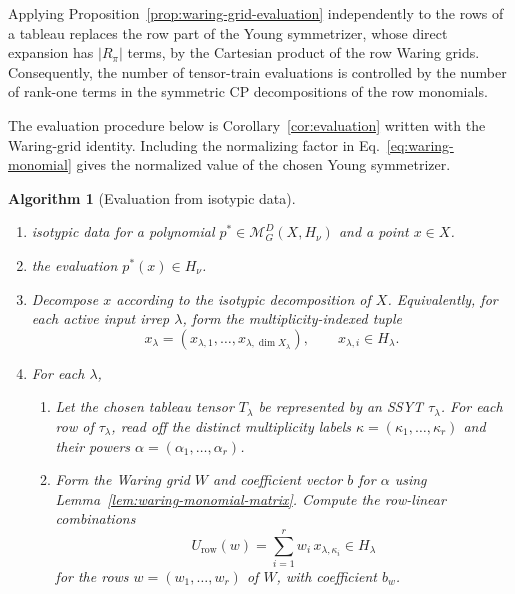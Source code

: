 \documentclass[11pt]{article}
\newcommand{\scM}{\mathcal{M}}
\newtheorem{algorithm}[theorem]{Algorithm}
\theoremstyle{definition}
\begin{document}
Applying Proposition~\ref{prop:waring-grid-evaluation} independently to the rows of a tableau replaces the row part of the Young symmetrizer, whose direct expansion has $|R_\pi|$ terms, by the Cartesian product of the row Waring grids.
Consequently, the number of tensor-train evaluations is controlled by the number of rank-one terms in the symmetric CP decompositions of the row monomials.

The evaluation procedure below is Corollary~\ref{cor:evaluation} written with the Waring-grid identity.
Including the normalizing factor in Eq.~\eqref{eq:waring-monomial} gives the normalized value of the chosen Young symmetrizer.

\begin{algorithm}[Evaluation from isotypic data]\label{alg:evaluate-basis}

  \phantom{}

  \begin{enumerate}[label=\textbf{Step \arabic*.},leftmargin=2.8cm]

    \item[\textbf{Input:}] isotypic data for a polynomial $p^* \in \scM_G^D(X,H_\nu)$ and a point $x \in X$.

    \item[\textbf{Output:}] the evaluation $p^*(x) \in H_\nu$.

    \item Decompose $x$ according to the isotypic decomposition of $X$.
    Equivalently, for each active input irrep $\lambda$, form the multiplicity-indexed tuple
    \[
      x_\lambda=(x_{\lambda,1},\dots,x_{\lambda,\dim X_\lambda}),
      \qquad
      x_{\lambda,i}\in H_\lambda.
    \]

    \item For each $\lambda$,
    \begin{enumerate}[label=\textup{(\alph*)},leftmargin=2.2em]
      \item Let the chosen tableau tensor $T_\lambda$ be represented by an SSYT $\tau_\lambda$.
      For each row of $\tau_\lambda$, read off the distinct multiplicity labels $\kappa=(\kappa_1,\dots,\kappa_r)$ and their powers $\alpha=(\alpha_1,\dots,\alpha_r)$.

      \item Form the Waring grid $W$ and coefficient vector $b$ for $\alpha$ using Lemma~\ref{lem:waring-monomial-matrix}.
      Compute the row-linear combinations
      \[
        U_{\mathrm{row}}(w)
        =
        \sum_{i=1}^r w_i\,x_{\lambda,\kappa_i}
        \in H_\lambda
      \]
      for the rows $w=(w_1,\dots,w_r)$ of $W$, with coefficient $b_w$.


\end{enumerate}
\end{enumerate}
\end{algorithm}
\end{document}
